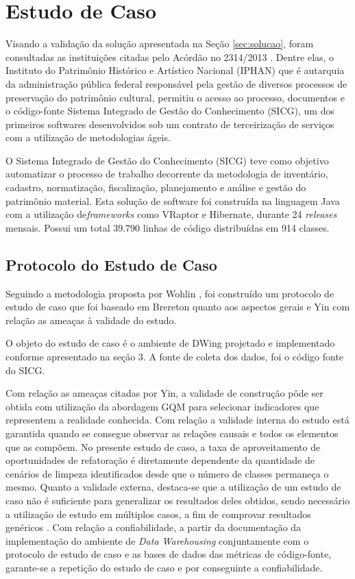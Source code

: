 \section {Estudo de Caso}

Visando a validação da solução apresentada na Seção \ref{sec:solucao}, foram consultadas as instituições citadas pelo Acórdão no 2314/2013 \cite{TCU:2013}. Dentre elas, o Instituto do Patrimônio Histórico e Artístico Nacional (IPHAN) que é autarquia da administração pública federal responsável pela gestão de diversos processos de preservação do patrimônio cultural, permitiu o acesso ao processo, documentos e o código-fonte Sistema Integrado de Gestão do Conhecimento (SICG), um dos primeiros softwares desenvolvidos sob um contrato de terceirização de serviços com a utilização de metodologias ágeis.

O Sistema Integrado de Gestão do Conhecimento (SICG) teve como objetivo automatizar o processo de trabalho decorrente da metodologia de inventário, cadastro, normatização, fiscalização, planejamento e análise e gestão do patrimônio material. Esta solução de software foi construída na linguagem Java com a utilização de\textit{frameworks} como VRaptor e Hibernate, durante 24 \textit{releases} mensais. Possui um total 39.790 linhas de código distribuídas em 914 classes.

\subsection{Protocolo do Estudo de Caso}
Seguindo a metodologia proposta por Wohlin \cite{wohlin2012experimentation}, foi construído um protocolo de estudo de caso que foi baseado em Brereton \cite{brereton2008using} quanto aos aspectos gerais e Yin \cite{yin2011applications} com relação as ameaças à validade do estudo. 

O objeto do estudo de caso é o ambiente de DWing projetado e implementado conforme apresentado na seção 3. A fonte de coleta dos dados, foi o código fonte do SICG.

Com relação as ameaças citadas por Yin, a validade de construção pôde ser obtida com utilização da abordagem GQM para selecionar indicadores que representem a realidade conhecida. Com relação a validade interna do estudo está garantida quando se consegue observar as relações causais e todos os elementos que as compõem. No presente estudo de caso, a taxa de aproveitamento de oportunidades de refatoração é diretamente dependente da quantidade de cenários de limpeza identificados desde que o número de classes permaneça o mesmo. Quanto a validade externa, destaca-se que a utilização de um estudo de caso não é suficiente para generalizar os resultados deles obtidos, sendo necessário a utilização de estudo em múltiplos casos, a fim de comprovar resultados genéricos \cite{yin2011applications}. Com relação a confiabilidade, a partir da documentação da implementação do ambiente de \textit{Data Warehousing} conjuntamente com o protocolo de estudo de caso e as bases de dados das métricas de código-fonte, garante-se a repetição do estudo de caso e por conseguinte a confiabilidade.


